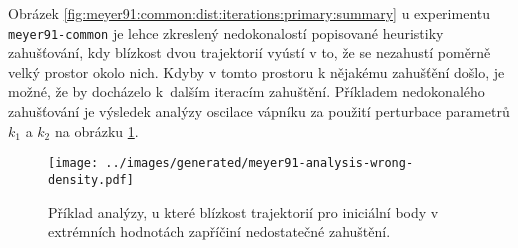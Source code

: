 Obrázek \ref{fig:meyer91:common:dist:iterations:primary:summary} u experimentu \texttt{meyer91-common} je lehce
zkreslený nedokonalostí popisované heuristiky zahušťování, kdy blízkost dvou trajektorií vyústí v to,
že se nezahustí poměrně velký prostor okolo nich. Kdyby v tomto prostoru k nějakému zahušťění došlo,
je možné, že by docházelo k~dalším iteracím zahuštění. Příkladem nedokonalého zahušťování je vý\-sle\-dek
analýzy oscilace vápníku za použití perturbace parametrů $k_1$ a $k_2$ na obrázku \ref{fig:meyer91:analysis:wrong:density}.

\begin{figure}[h!]
\begin{center}
	\texttt{[image: ../images/generated/meyer91-analysis-wrong-density.pdf]}
	\caption{Příklad analýzy, u které blízkost trajektorií pro iniciální body v extrémních hodnotách zapříčiní nedostatečné zahuštění.}
	\label{fig:meyer91:analysis:wrong:density}
\end{center}
\end{figure}
